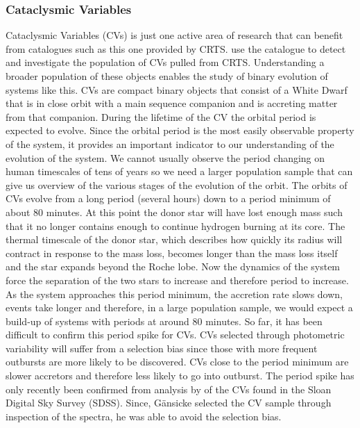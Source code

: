 \documentclass[a4paper,fleqn,usenatbib]{mnras}
\begin{document}
\subsubsection{Cataclysmic Variables}
Cataclysmic Variables (CVs) is just one active area of research that can benefit from catalogues such as this one provided by CRTS. \citet{Breedt2014} use the catalogue to detect and investigate the population of CVs pulled from CRTS. Understanding a broader population of these objects enables the study of binary evolution of systems like this. CVs are compact binary objects that consist of a White Dwarf that is in close orbit with a main sequence companion and is accreting matter from that companion. During the lifetime of the CV the orbital period is expected to evolve. Since the orbital period is the most easily observable property of the system, it provides an important indicator to our understanding of the evolution of the system. We cannot usually observe the period changing on human timescales of tens of years so we need a larger population sample that can give us overview of the various stages of the evolution of the orbit. The orbits of CVs evolve from a long period (several hours) down to a period minimum of about 80 minutes. At this point the donor star will have lost enough mass such that it no longer contains enough to continue hydrogen burning at its core. The thermal timescale of the donor star, which describes how quickly its radius will contract in response to the mass loss, becomes longer than the mass loss itself and the star expands beyond the Roche lobe. Now the dynamics of the system force the separation of the two stars to increase and therefore period to increase. As the system approaches this period minimum, the accretion rate slows down, events take longer and therefore, in a large population sample, we would expect a build-up of systems with periods at around 80 minutes. So far, it has been difficult to confirm this period spike for CVs.  CVs selected through photometric variability will suffer from a selection bias since those with more frequent outbursts are more likely to be discovered. CVs close to the period minimum are slower accretors and therefore less likely to go into outburst. The period spike has only recently been confirmed from analysis by \citet{Gaensicke2009} of the CVs found in the Sloan Digital Sky Survey (SDSS).  Since, G{\"a}nsicke selected the CV sample through inspection of the spectra, he was able to avoid the selection bias. 
\end{document}
